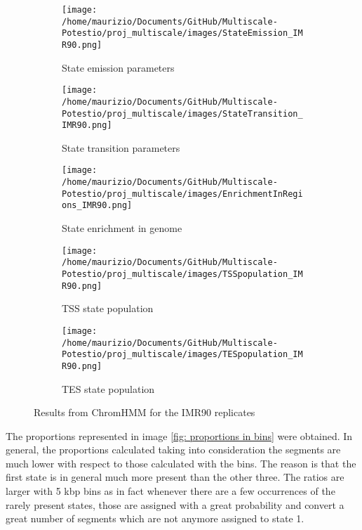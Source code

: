 \begin{figure}[H]
    \centering
    \begin{subfigure}[t]{0.08\textwidth}
      \texttt{[image: /home/maurizio/Documents/GitHub/Multiscale-Potestio/proj\_multiscale/images/StateEmission\_IMR90.png]}
      \caption{State emission parameters}
      \label{fig:State emission parameters}
  \end{subfigure}
  \begin{subfigure}[t]{0.13\textwidth}
      \texttt{[image: /home/maurizio/Documents/GitHub/Multiscale-Potestio/proj\_multiscale/images/StateTransition\_IMR90.png]}
      \caption{State transition parameters}
      \label{fig:State transition parameters}
  \end{subfigure}
  \begin{subfigure}[t]{0.18\textwidth}
      \texttt{[image: /home/maurizio/Documents/GitHub/Multiscale-Potestio/proj\_multiscale/images/EnrichmentInRegions\_IMR90.png]}
      \caption{State enrichment in genome}
      \label{fig:State enrichment in genome}
  \end{subfigure}
    \hspace{0.6\textwidth}
    \begin{subfigure}{0.39\textwidth}
      \texttt{[image: /home/maurizio/Documents/GitHub/Multiscale-Potestio/proj\_multiscale/images/TSSpopulation\_IMR90.png]}
      \caption{TSS state population}
      \label{fig:TSS state population}
    \end{subfigure}
    \begin{subfigure}{0.39\textwidth}
      \texttt{[image: /home/maurizio/Documents/GitHub/Multiscale-Potestio/proj\_multiscale/images/TESpopulation\_IMR90.png]}
      \caption{TES state population}
      \label{fig:TES state population}
    \end{subfigure}
  
    \caption{Results from ChromHMM for the IMR90 replicates}
    \label{fig:ChromHMM results}
\end{figure}


The proportions represented in image \ref{fig: proportions in bins} were obtained. In general, the proportions calculated taking into consideration the segments are much lower with respect to those calculated with the bins. The reason is that the first state is in general much more present than the other three. The ratios are larger with 5 kbp bins as in fact whenever there are a few occurrences of the rarely present states, those are assigned with a great probability and convert a great number of segments which are not anymore assigned to state 1.

